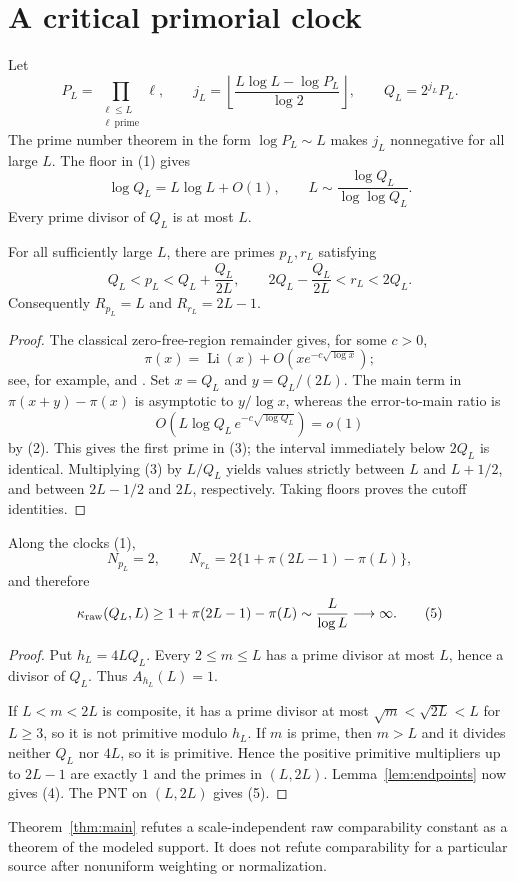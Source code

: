 \section{A critical primorial clock}

Let
\[
 P_L=\prod_{\substack{\ell\le L\\ \ell\ \mathrm{prime}}}\ell,
 \qquad
 j_L=\left\lfloor\frac{L\log L-\log P_L}{\log2}\right\rfloor,
 \qquad Q_L=2^{j_L}P_L . \tag{1}
\]
The prime number theorem in the form $\log P_L\sim L$ makes $j_L$ nonnegative for all
large $L$.  The floor in (1) gives
\[
 \log Q_L=L\log L+O(1),
 \qquad
 L\sim\frac{\log Q_L}{\log\log Q_L}. \tag{2}
\]
Every prime divisor of $Q_L$ is at most $L$.

\begin{lemma}\label{lem:endpoints}
For all sufficiently large $L$, there are primes $p_L,r_L$ satisfying
\[
 Q_L<p_L<Q_L+\frac{Q_L}{2L},
 \qquad
 2Q_L-\frac{Q_L}{2L}<r_L<2Q_L. \tag{3}
\]
Consequently $R_{p_L}=L$ and $R_{r_L}=2L-1$.
\end{lemma}

\begin{proof}
The classical zero-free-region remainder gives, for some $c>0$,
\[
 \pi(x)=\operatorname{Li}(x)+O\!\left(xe^{-c\sqrt{\log x}}\right);
\]
see, for example, \citet{davenport2000,montgomeryvaughan2007} and
\citet{iwanieckowalski2004}.  Set $x=Q_L$ and $y=Q_L/(2L)$.  The main term in
$\pi(x+y)-\pi(x)$ is asymptotic to $y/\log x$, whereas the error-to-main ratio is
\[
 O\!\left(L\log Q_L\,e^{-c\sqrt{\log Q_L}}\right)=o(1)
\]
by (2).  This gives the first prime in (3); the interval immediately below $2Q_L$ is
identical.  Multiplying (3) by $L/Q_L$ yields values strictly between $L$ and
$L+1/2$, and between $2L-1/2$ and $2L$, respectively.  Taking floors proves the
cutoff identities.
\end{proof}

\begin{theorem}\label{thm:main}
Along the clocks (1),
\[
 N_{p_L}=2,
 \qquad
 N_{r_L}=2\{1+\pi(2L-1)-\pi(L)\}, \tag{4}
\]
and therefore
\[
 \kappa_{\mathrm{raw}}(Q_L,L)
 \ge1+\pi(2L-1)-\pi(L)
 \sim\frac{L}{\log L}\longrightarrow\infty. \tag{5}
\]
\end{theorem}

\begin{proof}
Put $h_L=4LQ_L$.  Every $2\le m\le L$ has a prime divisor at most $L$, hence a
divisor of $Q_L$.  Thus $A_{h_L}(L)=1$.

If $L<m<2L$ is composite, it has a prime divisor at most
$\sqrt m<\sqrt{2L}<L$ for $L\ge3$, so it is not primitive modulo $h_L$.  If $m$ is
prime, then $m>L$ and it divides neither $Q_L$ nor $4L$, so it is primitive.  Hence
the positive primitive multipliers up to $2L-1$ are exactly $1$ and the primes in
$(L,2L)$.  Lemma~\ref{lem:endpoints} now gives (4).  The PNT on $(L,2L)$ gives (5).
\end{proof}

Theorem~\ref{thm:main} refutes a scale-independent raw comparability constant as a
theorem of the modeled support.  It does not refute comparability for a particular
source after nonuniform weighting or normalization.
